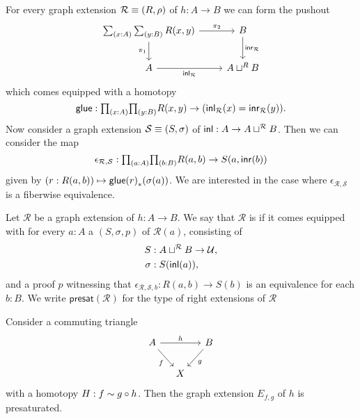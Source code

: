 For every graph extension $\mathcal{R}\equiv{\mathopen{}(R,\rho)\mathclose{}}$ of $h:A\to B$ we can form the pushout
\begin{equation*}
\begin{tikzcd}
\sm{x:A}{y:B}R(x,y) \arrow[r,"\pi_2"] \arrow[d,swap,"\pi_1"] & B \arrow[d,"\inr_{\mathcal{R}}"] \\
A \arrow[r,swap,"\inl_{\mathcal{R}}"] & A \sqcup^R B
\end{tikzcd}
\end{equation*}
which comes equipped with a homotopy
\begin{equation*}
\glue:\prd{x:A}{y:B} R(x,y)\to (\inl_{\mathcal{R}}(x)=\inr_{\mathcal{R}}(y)).
\end{equation*} 
Now consider a graph extension $\mathcal{S}\equiv{\mathopen{}(S,\sigma)\mathclose{}}$ of ${\mathsf{inl}}:A\to A\sqcup^{\mathcal{R}}B$.
Then we can consider the map
\begin{equation*}
\epsilon_{\mathcal{R},\mathcal{S}} : \prd{a:A}{b:B} R(a,b)\to S(a,\inr(b))
\end{equation*}
given by $(r:R(a,b))\mapsto {\mathsf{glue}(r)}_{*}\mathopen{}\left({\sigma(a)}\right)\mathclose{}$.
We are interested in the case where $\epsilon_{\mathcal{R},\mathcal{S}}$ is a fiberwise equivalence.

\begin{defn}
Let $\mathcal{R}$ be a graph extension of $h:A\to B$. We say that $\mathcal{R}$ is  if it comes equipped with for every $a:A$ a  $(S,\sigma,p)$ of $\mathcal{R}(a)$, consisting of
\begin{align*}
S & :A\sqcup^{\mathcal{R}}B\to\mathcal{U}, \\
\sigma & :S({\mathsf{inl}}(a)),
\end{align*}
and a proof $p$ witnessing that $\epsilon_{\mathcal{R},\mathcal{S},b}:R(a,b)\to S(b)$ is an equivalence for each $b:B$. We write $\mathsf{presat}(\mathcal{R})$ for the type of right extensions of $\mathcal{R}$
\end{defn}

\begin{lem}\label{thm:pb_presat}
Consider a commuting triangle
\begin{equation*}
\begin{tikzcd}[column sep=small]
A \arrow[rr,"h"] \arrow[dr,swap,"f"] & & B \arrow[dl,"g"] \\
& X
\end{tikzcd}
\end{equation*}
with a homotopy $H:f\sim g\circ h$. Then the graph extension $E_{f,g}$ of $h$ is presaturated.
\end{lem}

